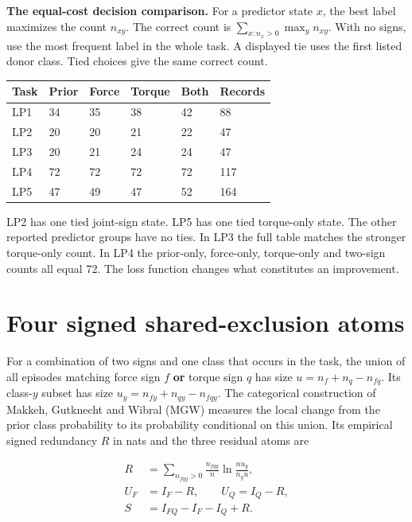 \textbf{The equal-cost decision comparison.} For a predictor state \(x\), the best label maximizes the count \(n_{xy}\). The correct count is \(\sum_{x:n_x>0}\max_y n_{xy}\). With no signs, use the most frequent label in the whole task. A displayed tie uses the first listed donor class. Tied choices give the same correct count.

{\def\LTcaptype{none} %
\begin{longtable}[]{@{}llllll@{}}
\toprule\noalign{}
Task & Prior & Force & Torque & Both & Records \\
\midrule\noalign{}
\endhead
\bottomrule\noalign{}
\endlastfoot
LP1 & 34 & 35 & 38 & 42 & 88 \\
LP2 & 20 & 20 & 21 & 22 & 47 \\
LP3 & 20 & 21 & 24 & 24 & 47 \\
LP4 & 72 & 72 & 72 & 72 & 117 \\
LP5 & 47 & 49 & 47 & 52 & 164 \\
\end{longtable}
}

LP2 has one tied joint-sign state. LP5 has one tied torque-only state. The other reported predictor groups have no ties. In LP3 the full table matches the stronger torque-only count. In LP4 the prior-only, force-only, torque-only and two-sign counts all equal 72. The loss function changes what constitutes an improvement.

\clearpage

\section{Four signed shared-exclusion atoms}\label{four-signed-shared-exclusion-atoms}

For a combination of two signs and one class that occurs in the task, the union of all episodes matching force sign \(f\) \textbf{or} torque sign \(q\) has size \(u=n_f+n_q-n_{fq}\). Its class-\(y\) subset has size \(u_y=n_{fy}+n_{qy}-n_{fqy}\). The categorical construction of Makkeh, Gutknecht and Wibral (MGW) measures the local change from the prior class probability to its probability conditional on this union. Its empirical signed redundancy \(R\) in nats and the three residual atoms are

\[
\begin{aligned}
R&=\sum_{n_{fqy}>0}\frac{n_{fqy}}n
       \ln\frac{n u_y}{n_y u},\\
U_F&=I_F-R,\qquad U_Q=I_Q-R,\\
S&=I_{FQ}-I_F-I_Q+R.
\end{aligned}
\]


